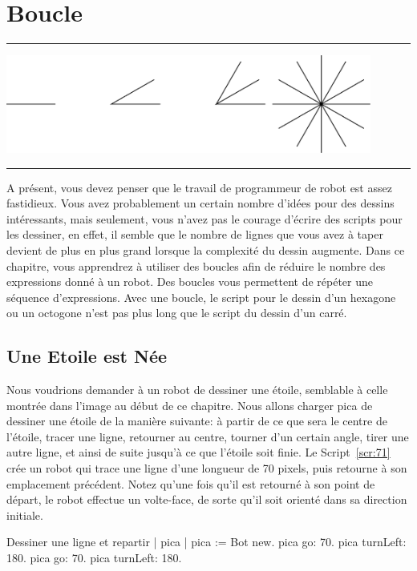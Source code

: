 \documentclass[a4paper,10pt,twoside]{book}
\begin{document}
    \sloppy
\fi

\chapter{Boucle}\label{cha:looping}

\noindent\hrule
\includegraphics[width=0.9\textwidth]{loopTitlePicture}
\noindent\hrule\vspace{1.5cm}

A présent, vous devez penser que le travail de programmeur de robot est assez 
fastidieux. Vous avez probablement un certain nombre d'idées pour des dessins 
intéressants, mais seulement, vous n'avez pas le courage d'écrire des scripts 
pour les dessiner, en effet, il semble que le nombre de lignes que vous avez à 
taper devient de plus en plus grand lorsque la complexité du dessin augmente. 
Dans ce chapitre, vous apprendrez à utiliser des boucles afin de réduire le nombre 
des expressions donné à un robot. Des boucles vous permettent de répéter une 
séquence d'expressions. Avec une boucle, le script pour le dessin d'un hexagone 
ou un octogone n'est pas plus long que le script du dessin d'un carré.

\section{Une Etoile est Née} 

Nous voudrions demander à un robot de dessiner une étoile, semblable à celle montrée 
dans l'image au début de ce chapitre. Nous allons charger pica de dessiner une étoile 
de la manière suivante: à partir de ce que sera le centre de l'étoile, tracer une 
ligne, retourner au centre, tourner d'un certain angle, tirer une autre ligne, et ainsi 
de suite jusqu'à ce que l'étoile soit finie. Le Script~\ref{scr:71} crée un robot qui 
trace une ligne d'une longueur de 70 pixels, puis retourne à son emplacement 
précédent. Notez qu'une fois qu'il est retourné à son point de départ, le robot effectue 
un volte-face, de sorte qu'il soit orienté dans sa direction initiale.

\begin{script}[71]{Dessiner une ligne et repartir }
| pica | 
pica := Bot new. 
pica go: 70. 
pica turnLeft: 180. 
pica go: 70. 
pica turnLeft: 180.
\end{script}
\end{document}

